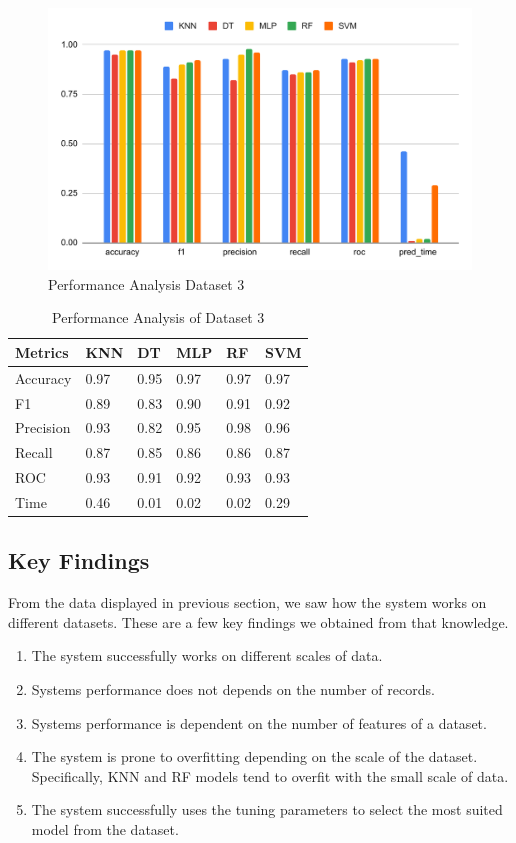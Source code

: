 \begin{figure}[ht]
    \centering
    \includegraphics[width=0.9\columnwidth]{media/sec04/dataset_3_performance_evaluation.pdf}
    \caption{Performance Analysis Dataset 3}
    \label{fig:performance_analysis_dataset_3}
\end{figure}

\begin{table}[ht]
\caption{Performance Analysis of Dataset 3}\label{tab:performance_analysis_dataset_3}
\begin{tabular*}{\tblwidth}{@{}LLLLLL@{}}
\toprule
Metrics & KNN & DT & MLP & RF & SVM \\ %
\midrule
Accuracy & 0.97 & 0.95 & 0.97 & 0.97 & 0.97 \\
F1 & 0.89 & 0.83 & 0.90 & 0.91 & 0.92 \\
Precision & 0.93 & 0.82 & 0.95 & 0.98 & 0.96 \\
Recall & 0.87 & 0.85 & 0.86 & 0.86 & 0.87 \\
ROC & 0.93 & 0.91 & 0.92 & 0.93 & 0.93 \\
Time & 0.46 & 0.01 & 0.02 & 0.02 & 0.29 \\
\bottomrule
\end{tabular*}
\end{table}

\subsection{Key Findings}\label{subsec:key_findings}
From the data displayed in previous section, we saw how the system works on different datasets. These are a few key findings we obtained from that knowledge.
\begin{enumerate}
    \item The system successfully works on different scales of data.
    \item Systems performance does not depends on the number of records.
    \item Systems performance is dependent on the number of features of a dataset.
    \item The system is prone to overfitting depending on the scale of the dataset. Specifically, KNN and RF models tend to overfit with the small scale of data.
    \item The system successfully uses the tuning parameters to select the most suited model from the dataset.
\end{enumerate}

